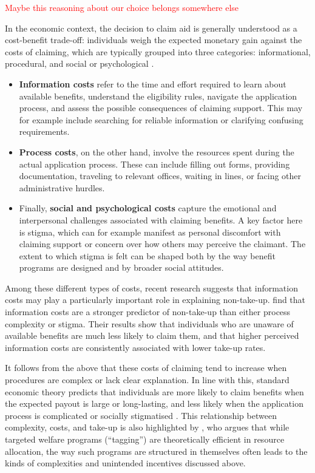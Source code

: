 \textcolor{red}{Maybe this reasoning about our choice belongs somewhere else}

In the economic context, the decision to claim aid is generally understood as a cost-benefit trade-off: individuals weigh the expected monetary gain against the costs of claiming, which are typically grouped into three categories: informational, procedural, and social or psychological \citep{booij_role_2012}. 

\begin{itemize}
  \item \textbf{Information costs} refer to the time and effort required to learn about available benefits, understand the eligibility rules, navigate the application process, and assess the possible consequences of claiming support. This may for example include searching for reliable information or clarifying confusing requirements.
  \item \textbf{Process costs}, on the other hand, involve the resources spent during the actual application process. These can include filling out forms, providing documentation, traveling to relevant offices, waiting in lines, or facing other administrative hurdles.
  \item Finally, \textbf{social and psychological costs} capture the emotional and interpersonal challenges associated with claiming benefits. A key factor here is stigma, which can for example manifest as personal discomfort with claiming support or concern over how others may perceive the claimant. The extent to which stigma is felt can be shaped both by the way benefit programs are designed and by broader social attitudes.
\end{itemize}

Among these different types of costs, recent research suggests that information costs may play a particularly important role in explaining non-take-up. \cite{bolland_information_nodate} find that information costs are a stronger predictor of non-take-up than either process complexity or stigma. Their results show that individuals who are unaware of available benefits are much less likely to claim them, and that higher perceived information costs are consistently associated with lower take-up rates. 

It follows from the above that these costs of claiming tend to increase when procedures are complex or lack clear explanation. In line with this, standard economic theory predicts that individuals are more likely to claim benefits when the expected payout is large or long-lasting, and less likely when the application process is complicated or socially stigmatised \citep{janssens_totake_2022, booij_role_2012}. This relationship between complexity, costs, and take-up is also highlighted by \cite{akerlof_tagging_1978}, who argues that while targeted welfare programs (“tagging”) are theoretically efficient in resource allocation, the way such programs are structured in themselves often leads to the kinds of complexities and unintended incentives discussed above.

